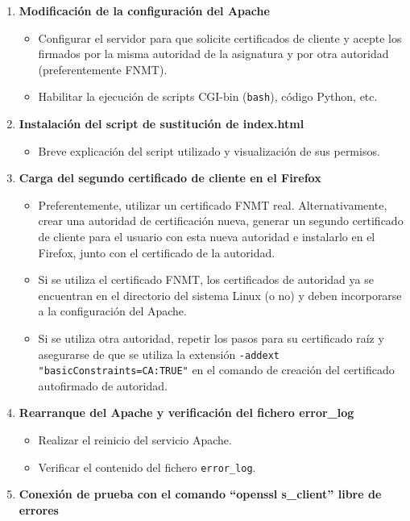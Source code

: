 \begin{enumerate}
    \item \textbf{Modificación de la configuración del Apache}
    \begin{itemize}
        \item Configurar el servidor para que solicite certificados de cliente y acepte los firmados por la misma autoridad de la asignatura y por otra autoridad (preferentemente FNMT).
        \item Habilitar la ejecución de scripts CGI-bin (\texttt{bash}), código Python, etc.
    \end{itemize}
    \item \textbf{Instalación del script de sustitución de index.html}
    \begin{itemize}
        \item Breve explicación del script utilizado y visualización de sus permisos.
    \end{itemize}
    \item \textbf{Carga del segundo certificado de cliente en el Firefox}
    \begin{itemize}
        \item Preferentemente, utilizar un certificado FNMT real. Alternativamente, crear una autoridad de certificación nueva, generar un segundo certificado de cliente para el usuario con esta nueva autoridad e instalarlo en el Firefox, junto con el certificado de la autoridad.
        \item Si se utiliza el certificado FNMT, los certificados de autoridad ya se encuentran en el directorio del sistema Linux (o no) y deben incorporarse a la configuración del Apache.
        \item Si se utiliza otra autoridad, repetir los pasos para su certificado raíz y asegurarse de que se utiliza la extensión \texttt{-addext "basicConstraints=CA:TRUE"} en el comando de creación del certificado autofirmado de autoridad.
    \end{itemize}
    \item \textbf{Rearranque del Apache y verificación del fichero error\_log}
    \begin{itemize}
        \item Realizar el reinicio del servicio Apache.
        \item Verificar el contenido del fichero \texttt{error\_log}.
    \end{itemize}
    \item \textbf{Conexión de prueba con el comando “openssl s\_client” libre de errores}

\end{enumerate}
